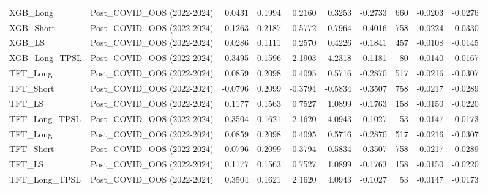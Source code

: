 \begin{tabular}{llrrrrrrrr}
\cline{1-10}
XGB\_Long & Post\_COVID\_OOS (2022-2024) & 0.0431 & 0.1994 & 0.2160 & 0.3253 & -0.2733 & 660 & -0.0203 & -0.0276 \\
\cline{1-10}
XGB\_Short & Post\_COVID\_OOS (2022-2024) & -0.1263 & 0.2187 & -0.5772 & -0.7964 & -0.4016 & 758 & -0.0224 & -0.0330 \\
\cline{1-10}
XGB\_LS & Post\_COVID\_OOS (2022-2024) & 0.0286 & 0.1111 & 0.2570 & 0.4226 & -0.1841 & 457 & -0.0108 & -0.0145 \\
\cline{1-10}
XGB\_Long\_TPSL & Post\_COVID\_OOS (2022-2024) & 0.3495 & 0.1596 & 2.1903 & 4.2318 & -0.1181 & 80 & -0.0140 & -0.0167 \\
\cline{1-10}
TFT\_Long & Post\_COVID\_OOS (2022-2024) & 0.0859 & 0.2098 & 0.4095 & 0.5716 & -0.2870 & 517 & -0.0216 & -0.0307 \\
\cline{1-10}
TFT\_Short & Post\_COVID\_OOS (2022-2024) & -0.0796 & 0.2099 & -0.3794 & -0.5834 & -0.3507 & 758 & -0.0217 & -0.0289 \\
\cline{1-10}
TFT\_LS & Post\_COVID\_OOS (2022-2024) & 0.1177 & 0.1563 & 0.7527 & 1.0899 & -0.1763 & 158 & -0.0150 & -0.0220 \\
\cline{1-10}
TFT\_Long\_TPSL & Post\_COVID\_OOS (2022-2024) & 0.3504 & 0.1621 & 2.1620 & 4.0943 & -0.1027 & 53 & -0.0147 & -0.0173 \\
\cline{1-10}
TFT\_Long & Post\_COVID\_OOS (2022-2024) & 0.0859 & 0.2098 & 0.4095 & 0.5716 & -0.2870 & 517 & -0.0216 & -0.0307 \\
\cline{1-10}
TFT\_Short & Post\_COVID\_OOS (2022-2024) & -0.0796 & 0.2099 & -0.3794 & -0.5834 & -0.3507 & 758 & -0.0217 & -0.0289 \\
\cline{1-10}
TFT\_LS & Post\_COVID\_OOS (2022-2024) & 0.1177 & 0.1563 & 0.7527 & 1.0899 & -0.1763 & 158 & -0.0150 & -0.0220 \\
\cline{1-10}
TFT\_Long\_TPSL & Post\_COVID\_OOS (2022-2024) & 0.3504 & 0.1621 & 2.1620 & 4.0943 & -0.1027 & 53 & -0.0147 & -0.0173 \\
\cline{1-10}
\bottomrule
\end{tabular}
